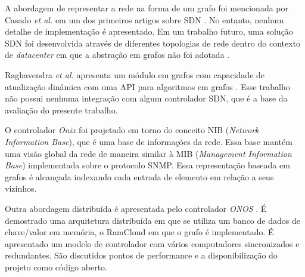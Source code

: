 A abordagem de representar a rede na forma de um grafo foi mencionada
por Casado \emph{et al.} em um dos primeiros artigos sobre SDN
\citep{martin2010virtualizing}.
No entanto, nenhum detalhe de implementação é apresentado.
Em um trabalho futuro, uma solução SDN foi desenvolvida através de
diferentes topologias de rede dentro do contexto de \emph{datacenter}
em que a abstração em grafos não foi adotada \citep{ripcord}.

Raghavendra \emph{et al.} apresenta um módulo em grafos com capacidade
de atualização dinâmica com uma API para algoritmos em grafos
\citep{ramya2012dynamic}.
Esse trabalho não possui nenhuma integração com algum controlador SDN,
que é a base da avaliação do presente trabalho.

O controlador \emph{Onix} \citep{teemu2010onix} foi projetado em torno do
conceito NIB (\emph{Network Information Base}), que é uma base
de informações da rede.
Essa base mantém uma visão global da rede de maneira similar à
MIB (\emph{Management Information Base}) implementada sobre o
protocolo SNMP.
Essa representação baseada em grafos é alcançada indexando cada
entrada de elemento em relação a seus vizinhos.

Outra abordagem distribuída é apresentada pelo controlador \emph{ONOS}
\citep{berde2016onos}.
É demostrado uma arquitetura distribuída em que se
utiliza um banco de dados de chave/valor em memória, o RamCloud
\citep{ousterhout2015ramcloud} em que o grafo é implementado.
É apresentado um modelo de controlador com vários computadores sincronizados
e redundantes.
São discutidos pontos de performance e a disponibilização do projeto como
código aberto.
